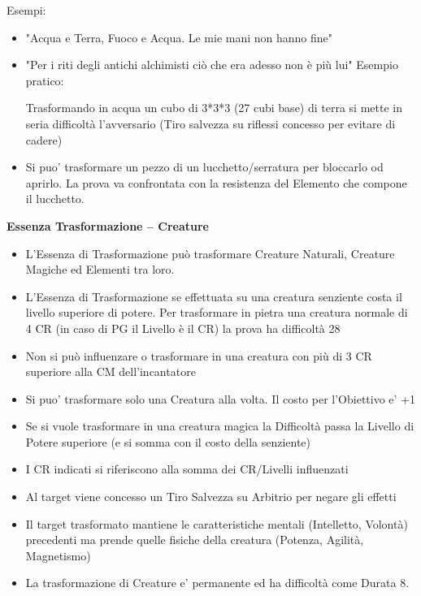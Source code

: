 \documentclass[a4paper,10 pt,twoside,openany]{book}
\begin{document}
Esempi:
\begin{itemize}
	\item
	"Acqua e Terra, Fuoco e Acqua. Le mie mani non hanno fine"
	\item
	"Per i riti degli antichi alchimisti ciò che era adesso non è più lui"
	Esempio pratico:

	Trasformando in acqua un cubo di 3{*}3{*}3 (27 cubi base) di terra si mette in seria difficoltà l'avversario (Tiro salvezza su riflessi concesso per evitare di cadere)
	\item
	Si puo' trasformare un pezzo di un lucchetto/serratura per bloccarlo od aprirlo. La prova va confrontata con la resistenza del Elemento che compone il lucchetto.
\end{itemize}

\bigskip

\textbf{Essenza Trasformazione -- Creature}

\begin{itemize}
	\item
	L'Essenza di Trasformazione può trasformare Creature Naturali, Creature Magiche ed Elementi tra loro.
	\item
	L'Essenza di Trasformazione se effettuata su una creatura senziente costa il livello superiore di potere. Per trasformare in pietra una creatura normale di 4 CR (in caso di PG il Livello è il CR) la prova ha difficoltà 28
	\item
	Non si può influenzare o trasformare in una creatura con più di 3 CR superiore alla CM dell'incantatore
	\item
	Si puo' trasformare solo una Creatura alla volta. Il costo per l'Obiettivo e' +1
	\item
	Se si vuole trasformare in una creatura magica la Difficoltà passa la Livello di Potere superiore (e si somma con il costo della senziente)
	\item
	I CR indicati si riferiscono alla somma dei CR/Livelli influenzati
	\item
	Al target viene concesso un Tiro Salvezza su Arbitrio per negare gli effetti
	\item
	Il target trasformato mantiene le caratteristiche mentali (Intelletto, Volontà) precedenti ma prende quelle fisiche della creatura (Potenza, Agilità, Magnetismo)

	\item
	La trasformazione di Creature e' permanente ed ha difficoltà come Durata 8.

\end{itemize}
\end{document}
